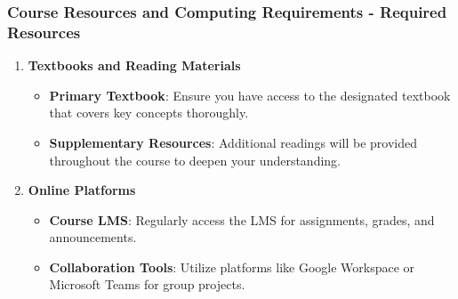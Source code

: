 \documentclass[aspectratio=169]{beamer}
\begin{document}
\begin{frame}[fragile]
    \frametitle{Course Resources and Computing Requirements - Required Resources}
    \begin{enumerate}
        \item \textbf{Textbooks and Reading Materials}
        \begin{itemize}
            \item \textbf{Primary Textbook}: Ensure you have access to the designated textbook that covers key concepts thoroughly.
            \item \textbf{Supplementary Resources}: Additional readings will be provided throughout the course to deepen your understanding.
        \end{itemize}

        \item \textbf{Online Platforms}
        \begin{itemize}
            \item \textbf{Course LMS}: Regularly access the LMS for assignments, grades, and announcements.
            \item \textbf{Collaboration Tools}: Utilize platforms like Google Workspace or Microsoft Teams for group projects.
        \end{itemize}
    \end{enumerate}
\end{frame}
\end{document}
